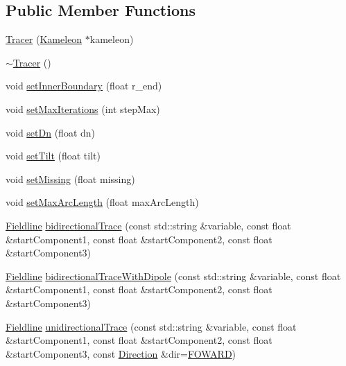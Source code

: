 \subsection*{Public Member Functions}
\begin{DoxyCompactItemize}
\item 
\hyperlink{classccmc_1_1_tracer_a16f3484aa70343874800adfce15b7d48}{Tracer} (\hyperlink{classccmc_1_1_kameleon}{Kameleon} $\ast$kameleon)
\item 
\hyperlink{classccmc_1_1_tracer_ac9c1fdded6293841a58a3f672b775577}{$\sim$\-Tracer} ()
\item 
void \hyperlink{classccmc_1_1_tracer_a8b67d175f78a67e8f9119a9b105bfb8b}{set\-Inner\-Boundary} (float r\-\_\-end)
\item 
void \hyperlink{classccmc_1_1_tracer_aecadbaf86210183e93561cfd994e5cb3}{set\-Max\-Iterations} (int step\-Max)
\item 
void \hyperlink{classccmc_1_1_tracer_ab487539d33afad7fb6642d4bd3ccc555}{set\-Dn} (float dn)
\item 
void \hyperlink{classccmc_1_1_tracer_aa729fd6391a148f9bad170a652ec6d7d}{set\-Tilt} (float tilt)
\item 
void \hyperlink{classccmc_1_1_tracer_a2b4ada2551d3d6db929f6f4b59fe6cb0}{set\-Missing} (float missing)
\item 
void \hyperlink{classccmc_1_1_tracer_a22c8cf8a9c801e38f7bd4fe8cc224f1c}{set\-Max\-Arc\-Length} (float max\-Arc\-Length)
\item 
\hyperlink{classccmc_1_1_fieldline}{Fieldline} \hyperlink{classccmc_1_1_tracer_a47783816bdcacaa27f0c4535bba42c1f}{bidirectional\-Trace} (const std\-::string \&variable, const float \&start\-Component1, const float \&start\-Component2, const float \&start\-Component3)
\item 
\hyperlink{classccmc_1_1_fieldline}{Fieldline} \hyperlink{classccmc_1_1_tracer_a15158cc5fe5eb9a0372d85b9d81d798d}{bidirectional\-Trace\-With\-Dipole} (const std\-::string \&variable, const float \&start\-Component1, const float \&start\-Component2, const float \&start\-Component3)
\item 
\hyperlink{classccmc_1_1_fieldline}{Fieldline} \hyperlink{classccmc_1_1_tracer_a3166d314066e3c83e935e01b37554e63}{unidirectional\-Trace} (const std\-::string \&variable, const float \&start\-Component1, const float \&start\-Component2, const float \&start\-Component3, const \hyperlink{classccmc_1_1_tracer_a2c914b28e2e205cb1a7c01f2941fcae2}{Direction} \&dir=\hyperlink{classccmc_1_1_tracer_a2c914b28e2e205cb1a7c01f2941fcae2a133381f1178a2affb0f1c79a67b45e52}{F\-O\-W\-A\-R\-D})

\end{DoxyCompactItemize}
